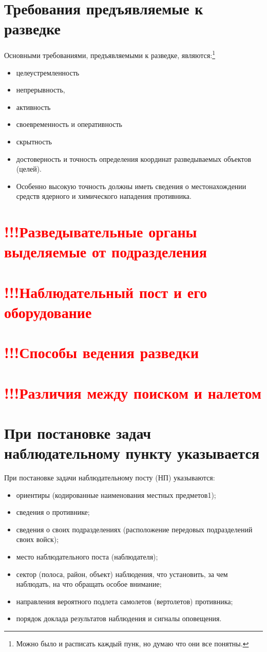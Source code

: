 \documentclass[12pt,a4paper]{report}
\begin{document}
\section{Требования предъявляемые к разведке}
Основными требованиями, предъявляемыми к разведке, являются:\footnote{Можно было и расписать каждый пунк, но думаю что они все понятны.} 
\begin{itemize} 
\item целеустремленность
\item непрерывность,
\item активность
\item своевременность и оперативность
\item скрытность 
\item достоверность и точность определения координат разведываемых объектов (целей).
\item Особенно высокую точность должны иметь сведения о местонахождении средств ядерного и химического нападения противника.
\end{itemize}
\section{\textcolor{red}{!!!Разведывательные органы выделяемые от подразделения} }
\section{\textcolor{red}{!!!Наблюдательный пост и его оборудование}}
\section{\textcolor{red}{!!!Способы ведения разведки}}
\section{\textcolor{red}{!!!Различия между поиском и налетом}}

\section{При постановке задач наблюдательному пункту указывается}
При постановке задачи наблюдательному посту (НП) указываются:
\begin{itemize}
\item ориентиры (кодированные наименования местных предметов1);
\item сведения о противнике;
\item сведения о своих подразделениях (расположение передовых подразделений своих войск);
\item место наблюдательного поста (наблюдателя);
\item сектор (полоса, район, объект) наблюдения, что установить, за чем наблюдать, на что обращать особое внимание;
\item направления вероятного подлета самолетов (вертолетов) противника;
\item порядок доклада результатов наблюдения и сигналы оповещения.
\end{itemize}
\end{document}
